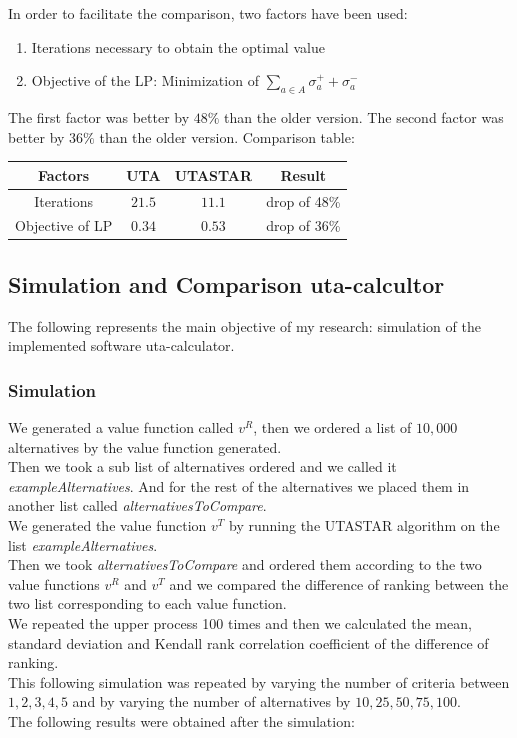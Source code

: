 \documentclass{report}
\begin{document}
In order to facilitate the comparison, two factors have been used:
\begin{enumerate}
\item Iterations necessary to obtain the optimal value
\item Objective of the LP: Minimization of $ \sum_{a \in A} \sigma _{a}^{+} + \sigma _{a}^{-} $ 
\end{enumerate}

The first factor was better by $48\%$ than the older version. The second factor was better by $36\%$ than the older version. 
Comparison table:

\begin{center}
\begin{tabular}{| c | c | c | c |} 
\hline
Factors & UTA & UTASTAR & Result \\
\hline
Iterations & $21.5$ & $11.1$ & drop of 48\% \\ 
\hline
Objective of LP & $0.34$ & $0.53$ & drop of 36\%\\ 
\hline
\end{tabular}
\end{center}

\subsection{Simulation and Comparison uta-calcultor}
The following represents the main objective of my research: simulation of the implemented software uta-calculator. 
\subsubsection{Simulation}
We generated a value function called $v^R$, then we ordered a list of $10,000$ alternatives by the value function generated.\\
Then we took a sub list of alternatives ordered and we called it \textit{exampleAlternatives}. And for the rest of the alternatives we placed them in another list called \textit{alternativesToCompare}.\\
We generated the value function $v^T$ by running the UTASTAR algorithm on the list \textit{exampleAlternatives}. \\
Then we took \textit{alternativesToCompare} and ordered them according to the two value functions $v^R$ and $v^T$ and we compared the difference of ranking between the two list corresponding to each value function.\\
We repeated the upper process 100 times and then we calculated the mean, standard deviation and Kendall rank correlation coefficient of the difference of ranking. \\
This following simulation was repeated by varying the number of criteria between $1,2,3,4,5$ and by varying the number of alternatives by $10, 25, 50, 75, 100$.\\
The following results were obtained after the simulation:\\
\end{document}
